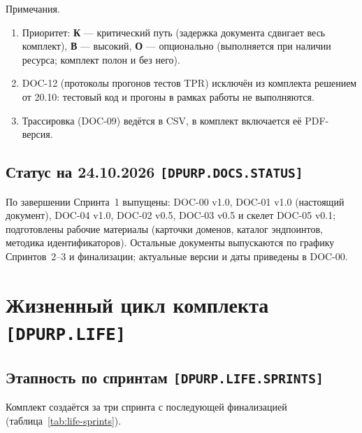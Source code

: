 \documentclass[12pt,a4paper]{article}
\begin{document}
\noindent Примечания.
\begin{enumerate}
  \item Приоритет: \textbf{К} — критический путь (задержка документа сдвигает весь
        комплект), \textbf{В} — высокий, \textbf{О} — опционально (выполняется при
        наличии ресурса; комплект полон и без него).
  \item DOC-12 (протоколы прогонов тестов TPR) исключён из комплекта решением
        от 20.10: тестовый код и прогоны в рамках работы не выполняются.
  \item Трассировка (DOC-09) ведётся в CSV, в комплект включается её PDF-версия.
\end{enumerate}

\subsection{Статус на 24.10.2026 \texttt{[DPURP.DOCS.STATUS]}}
По завершении Спринта~1 выпущены: DOC-00 v1.0, DOC-01 v1.0 (настоящий документ),
DOC-04 v1.0, DOC-02 v0.5, DOC-03 v0.5 и скелет DOC-05 v0.1; подготовлены рабочие
материалы (карточки доменов, каталог эндпоинтов, методика идентификаторов).
Остальные документы выпускаются по графику Спринтов~2--3 и финализации;
актуальные версии и даты приведены в DOC-00.

\section{Жизненный цикл комплекта \texttt{[DPURP.LIFE]}}

\subsection{Этапность по спринтам \texttt{[DPURP.LIFE.SPRINTS]}}
Комплект создаётся за три спринта с последующей финализацией (таблица~\ref{tab:life-sprints}).
\end{document}
